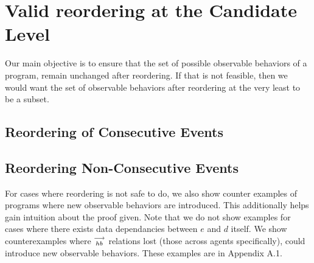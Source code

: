 
\section{Valid reordering at the Candidate Level}
    
    Our main objective is to ensure that the set of possible observable behaviors of a program, remain unchanged after reordering.
    If that is not feasible, then we would want the set of observable behaviors after reordering at the very least to be a subset.

    \subsection{Reordering of Consecutive Events}
        
        

    \subsection{Reordering Non-Consecutive Events}
        

    For cases where reordering is not safe to do, we also show counter examples of programs where new observable behaviors are introduced.
    This additionally helps gain intuition about the proof given. 
    Note that we do not show examples for cases where there exists data dependancies between $e$ and $d$ itself. 
    We show counterexamples where $\stackrel{\longrightarrow}{_{hb}}$ relations lost (those across agents specifically), could introduce new observable behaviors. 
    These examples are in Appendix A.1.

